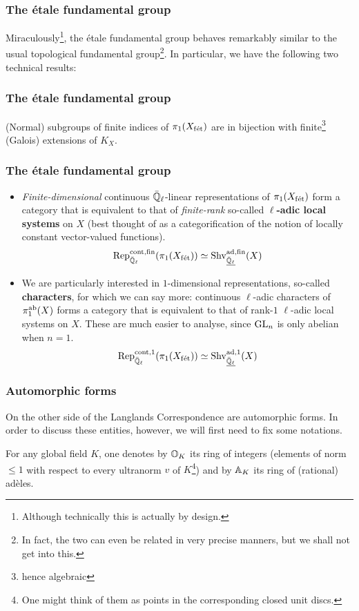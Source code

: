 \documentclass{beamer}
\begin{document}
    \begin{frame}
        \frametitle{The \'etale fundamental group}
        
        Miraculously\footnote{Although technically this is actually by design.}, the \'etale fundamental group behaves remarkably similar to the usual topological fundamental group\footnote{In fact, the two can even be related in very precise manners, but we shall not get into this.}. In particular, we have the following two technical results:
    \end{frame}
    
    \begin{frame}
        \frametitle{The \'etale fundamental group}
        
        (Normal) subgroups of finite indices of $\pi_1(X_{\mathrm{f\acute{e}t}})$ are in bijection with finite\footnote{hence algebraic} (Galois) extensions of $K_X$.
    \end{frame}
    
    \begin{frame}
        \frametitle{The \'etale fundamental group}
        
        \begin{itemize}
            \item \textit{Finite-dimensional} continuous $\bar{\mathbb{Q}}_{\ell}$-linear representations of $\pi_1(X_{\mathrm{f\acute{e}t}})$ form a category that is equivalent to that of \textit{finite-rank} so-called \textbf{$\ell$-adic local systems} on $X$ (best thought of as a categorification of the notion of locally constant vector-valued functions). 
                $$\mathrm{Rep}^{\mathrm{cont}, \mathrm{fin}}_{\bar{\mathbb{Q}}_{\ell}}(\pi_1(X_{\mathrm{f\acute{e}t}})) \simeq \mathrm{Shv}_{\underline{\bar{\mathbb{Q}}_{\ell}}}^{\mathrm{ad}, \mathrm{fin}}(X)$$
            \item We are particularly interested in $1$-dimensional representations, so-called \textbf{characters}, for which we can say more: continuous $\ell$-adic characters of $\pi_1^{\mathrm{ab}}(X)$ forms a category that is equivalent to that of rank-$1$ $\ell$-adic local systems on $X$. These are much easier to analyse, since $\operatorname{GL}_n$ is only abelian when $n = 1$.
                $$\mathrm{Rep}^{\mathrm{cont}, 1}_{\bar{\mathbb{Q}}_{\ell}}(\pi_1(X_{\mathrm{f\acute{e}t}})) \simeq \mathrm{Shv}_{\underline{\bar{\mathbb{Q}}_{\ell}}}^{\mathrm{ad}, 1}(X)$$
        \end{itemize}
    \end{frame}
    
    \begin{frame}
        \frametitle{Automorphic forms}
        
        On the other side of the Langlands Correspondence are automorphic forms. In order to discuss these entities, however, we will first need to fix some notations. 
        
        For any global field $K$, one denotes by $\mathbb{O}_K$ its ring of integers (elements of norm $\leq 1$ with respect to every ultranorm $v$ of $K$\footnote{One might think of them as points in the corresponding closed unit discs.}) and by $\mathbb{A}_K$ its ring of (rational) ad\`eles.
    \end{frame}
    
\end{document}
